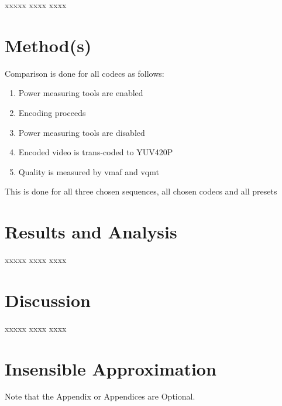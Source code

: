\documentclass[12pt,twoside]{article}
\begin{document}
xxxxx xxxx xxxx 


\section{Method(s)}
\label{sec:method}
Comparison is done for all codecs as follows:
\begin{enumerate}
	\item Power measuring tools are enabled
	\item Encoding proceeds
	\item Power measuring tools are disabled
	\item Encoded video is trans-coded to YUV420P
	\item Quality is measured by \acrshort{vmaf} and \acrshort{vqmt}
\end{enumerate}
This is done for all three chosen sequences, all chosen codecs and all presets
\section{Results and Analysis}
\label{sec:results}

xxxxx xxxx xxxx 

\section{Discussion}
\label{sec:discussion}
xxxxx xxxx xxxx 

\printbibliography
\appendix
\section{Insensible Approximation}

Note that the Appendix or Appendices are Optional.
\end{document}
